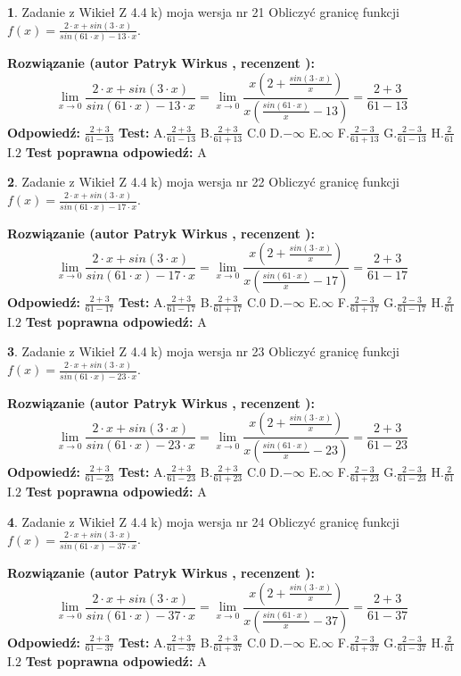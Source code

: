 \documentclass[12pt, a4paper]{article}
\theoremstyle{definition} %
\newtheorem{zad}{}
\newcommand{\zadStart}[1]{\begin{zad}#1\newline}
\newcommand{\zadStop}{\end{zad}}
\newcommand{\rozwStart}[2]{\noindent \textbf{Rozwiązanie (autor #1 , recenzent #2): }\newline}
\newcommand{\rozwStop}{\newline}
\newcommand{\odpStart}{\noindent \textbf{Odpowiedź:}\newline}
\newcommand{\odpStop}{\newline}
\newcommand{\testStart}{\noindent \textbf{Test:}\newline}
\newcommand{\testStop}{\newline}
\newcommand{\kluczStart}{\noindent \textbf{Test poprawna odpowiedź:}\newline}
\newcommand{\kluczStop}{\newline}
\begin{document}
\zadStart{Zadanie z Wikieł Z 4.4 k) moja wersja nr 21}
Obliczyć granicę funkcji $f(x)=\frac{2\cdot x +sin(3\cdot x)}{sin(61\cdot x) -13\cdot x}$.
\zadStop
\rozwStart{Patryk Wirkus}{}
$$\lim\limits_{x\to 0}\frac{2\cdot x +sin(3\cdot x)}{sin(61\cdot x) -13\cdot x}
=\lim\limits_{x\to 0}\frac{x(2+\frac{sin(3\cdot x)}{x})}{x(\frac{sin(61\cdot x)}{x}-13)}
=\frac{2+3}{61-13}$$
\rozwStop
\odpStart
$\frac{2+3}{61-13}$
\odpStop
\testStart
A.$\frac{2+3}{61-13}$
B.$\frac{2+3}{61+13}$
C.$0$
D.$-\infty$
E.$\infty$
F.$\frac{2-3}{61+13}$
G.$\frac{2-3}{61-13}$
H.$\frac{2}{61}$
I.$2$
\testStop
\kluczStart
A
\kluczStop



\zadStart{Zadanie z Wikieł Z 4.4 k) moja wersja nr 22}
Obliczyć granicę funkcji $f(x)=\frac{2\cdot x +sin(3\cdot x)}{sin(61\cdot x) -17\cdot x}$.
\zadStop
\rozwStart{Patryk Wirkus}{}
$$\lim\limits_{x\to 0}\frac{2\cdot x +sin(3\cdot x)}{sin(61\cdot x) -17\cdot x}
=\lim\limits_{x\to 0}\frac{x(2+\frac{sin(3\cdot x)}{x})}{x(\frac{sin(61\cdot x)}{x}-17)}
=\frac{2+3}{61-17}$$
\rozwStop
\odpStart
$\frac{2+3}{61-17}$
\odpStop
\testStart
A.$\frac{2+3}{61-17}$
B.$\frac{2+3}{61+17}$
C.$0$
D.$-\infty$
E.$\infty$
F.$\frac{2-3}{61+17}$
G.$\frac{2-3}{61-17}$
H.$\frac{2}{61}$
I.$2$
\testStop
\kluczStart
A
\kluczStop



\zadStart{Zadanie z Wikieł Z 4.4 k) moja wersja nr 23}
Obliczyć granicę funkcji $f(x)=\frac{2\cdot x +sin(3\cdot x)}{sin(61\cdot x) -23\cdot x}$.
\zadStop
\rozwStart{Patryk Wirkus}{}
$$\lim\limits_{x\to 0}\frac{2\cdot x +sin(3\cdot x)}{sin(61\cdot x) -23\cdot x}
=\lim\limits_{x\to 0}\frac{x(2+\frac{sin(3\cdot x)}{x})}{x(\frac{sin(61\cdot x)}{x}-23)}
=\frac{2+3}{61-23}$$
\rozwStop
\odpStart
$\frac{2+3}{61-23}$
\odpStop
\testStart
A.$\frac{2+3}{61-23}$
B.$\frac{2+3}{61+23}$
C.$0$
D.$-\infty$
E.$\infty$
F.$\frac{2-3}{61+23}$
G.$\frac{2-3}{61-23}$
H.$\frac{2}{61}$
I.$2$
\testStop
\kluczStart
A
\kluczStop



\zadStart{Zadanie z Wikieł Z 4.4 k) moja wersja nr 24}
Obliczyć granicę funkcji $f(x)=\frac{2\cdot x +sin(3\cdot x)}{sin(61\cdot x) -37\cdot x}$.
\zadStop
\rozwStart{Patryk Wirkus}{}
$$\lim\limits_{x\to 0}\frac{2\cdot x +sin(3\cdot x)}{sin(61\cdot x) -37\cdot x}
=\lim\limits_{x\to 0}\frac{x(2+\frac{sin(3\cdot x)}{x})}{x(\frac{sin(61\cdot x)}{x}-37)}
=\frac{2+3}{61-37}$$
\rozwStop
\odpStart
$\frac{2+3}{61-37}$
\odpStop
\testStart
A.$\frac{2+3}{61-37}$
B.$\frac{2+3}{61+37}$
C.$0$
D.$-\infty$
E.$\infty$
F.$\frac{2-3}{61+37}$
G.$\frac{2-3}{61-37}$
H.$\frac{2}{61}$
I.$2$
\testStop
\kluczStart
A
\kluczStop
\end{document}
